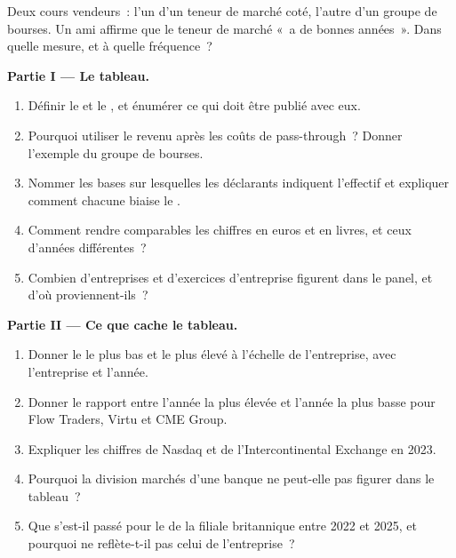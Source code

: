 \begin{problem}\label{pb:in:revenue-and-profit-across-the-industry:1}
Deux cours vendeurs~: l'un d'un teneur de marché coté, l'autre d'un groupe de bourses. Un ami affirme que le teneur de marché «~a de bonnes
années~». Dans quelle mesure, et à quelle fréquence~?

\medskip\noindent\textbf{Partie I --- Le tableau.}
\begin{enumerate}
\item Définir le  et le , et énumérer ce qui doit être publié avec eux.
\item Pourquoi utiliser le revenu après les coûts de pass-through~? Donner l'exemple du groupe de bourses.
\item Nommer les bases sur lesquelles les déclarants indiquent l'effectif et expliquer comment chacune biaise le .
\item Comment rendre comparables les chiffres en euros et en livres, et ceux d'années différentes~?
\item Combien d'entreprises et d'exercices d'entreprise figurent dans le panel, et d'où proviennent-ils~?
\end{enumerate}

\medskip\noindent\textbf{Partie II --- Ce que cache le tableau.}
\begin{enumerate}[resume]
\item Donner le  le plus bas et le plus élevé à l'échelle de l'entreprise, avec l'entreprise et l'année.
\item Donner le rapport entre l'année la plus élevée et l'année la plus basse pour Flow Traders, Virtu et CME Group.
\item Expliquer les chiffres de Nasdaq et de l'Intercontinental Exchange en 2023.
\item Pourquoi la division marchés d'une banque ne peut-elle pas figurer dans le tableau~?
\item Que s'est-il passé pour le  de la filiale britannique entre 2022 et 2025, et pourquoi ne reflète-t-il pas celui de l'entreprise~?
\end{enumerate}


\end{problem}
